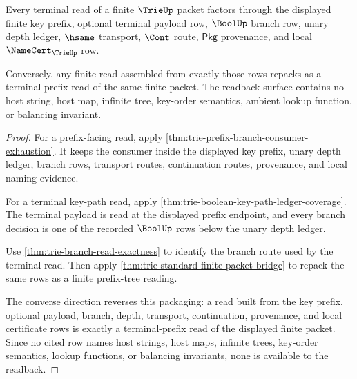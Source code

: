 \begin{theorem}\label{thm:trie-terminal-prefix-readback-coverage}
Every terminal read of a finite $\TrieUp$ packet factors through the displayed
finite key prefix, optional terminal payload row, $\BoolUp$ branch row, unary
depth ledger, $\hsame$ transport, $\Cont$ route, $\mathsf{Pkg}$ provenance,
and local $\NameCert_{\TrieUp}$ row.

Conversely, any finite read assembled from exactly those rows repacks as a
terminal-prefix read of the same finite packet. The readback surface contains
no host string, host map, infinite tree, key-order semantics, ambient lookup
function, or balancing invariant.
\end{theorem}
\begin{proof}
For a prefix-facing read, apply
\autoref{thm:trie-prefix-branch-consumer-exhaustion}. It keeps the consumer
inside the displayed key prefix, unary depth ledger, branch rows, transport
routes, continuation routes, provenance, and local naming evidence.

For a terminal key-path read, apply
\autoref{thm:trie-boolean-key-path-ledger-coverage}. The terminal payload is
read at the displayed prefix endpoint, and every branch decision is one of the
recorded $\BoolUp$ rows below the unary depth ledger.

Use \autoref{thm:trie-branch-read-exactness} to identify the branch route
used by the terminal read. Then apply
\autoref{thm:trie-standard-finite-packet-bridge} to repack the same rows as a
finite prefix-tree reading.

The converse direction reverses this packaging: a read built from the key
prefix, optional payload, branch, depth, transport, continuation, provenance,
and local certificate rows is exactly a terminal-prefix read of the displayed
finite packet. Since no cited row names host strings, host maps, infinite
trees, key-order semantics, lookup functions, or balancing invariants, none is
available to the readback.
\end{proof}

